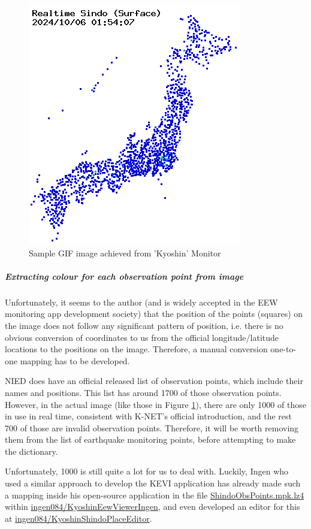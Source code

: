 \documentclass[10pt]{article}
\newcommand{\GitHubHref}[2]{\href{https://github.com/#1/#2}{\faGithub\space #1/#2}}
\begin{document}
\begin{figure}[!ht]
    \centering
    \includegraphics[width = 0.5\linewidth]{sample-kmoni.png}
    \caption{Sample GIF image achieved from 'Kyoshin' Monitor}
    \label{fig:sample-kmoni}
\end{figure}

\subparagraph{Extracting colour for each observation point from image} Unfortunately, it seems to the author (and is widely accepted in the EEW monitoring app development society) that the position of the points (squares) on the image does not follow any significant pattern of position, i.e. there is no obvious conversion of coordinates to us from the official longitude/latitude locations to the positions on the image. Therefore, a manual conversion one-to-one mapping has to be developed.

NIED does have an official released list of observation points, which include their names and positions. This list has around 1700 of those observation points. However, in the actual image (like those in Figure \ref{fig:sample-kmoni}), there are only 1000 of those in use in real time, consistent with K-NET's official introduction, and the rest 700 of those are invalid observation points. Therefore, it will be worth removing them from the list of earthquake monitoring points, before attempting to make the dictionary.

Unfortunately, 1000 is still quite a lot for us to deal with. Luckily, Ingen who used a similar approach to develop the KEVI application has already made such a mapping inside his open-source application in the file \href{https://github.com/ingen084/KyoshinEewViewerIngen/blob/develop/src/KyoshinEewViewer/Assets/ShindoObsPoints.mpk.lz4}{ShindoObsPoints.mpk.lz4} within \GitHubHref{ingen084}{KyoshinEewViewerIngen}, and even developed an editor for this at \GitHubHref{ingen084}{KyoshinShindoPlaceEditor}.
\end{document}
